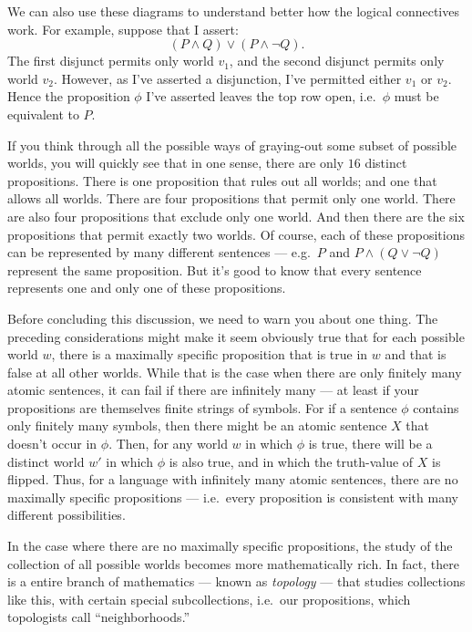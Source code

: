 We can also use these diagrams to understand better how the logical
connectives work.  For example, suppose that I assert:
\[ (P\wedge Q)\vee (P\wedge \neg Q) .\] The first disjunct permits
only world $v_1$, and the second disjunct permits only world $v_2$.
However, as I've asserted a disjunction, I've permitted either $v_1$
or $v_2$.  Hence the proposition $\phi$ I've asserted leaves the top
row open, i.e.\ $\phi$ must be equivalent to $P$.

If you think through all the possible ways of graying-out some subset
of possible worlds, you will quickly see that in one sense, there are
only $16$ distinct propositions.  There is one proposition that rules
out all worlds; and one that allows all worlds.  There are four
propositions that permit only one world.  There are also four
propositions that exclude only one world.  And then there are the six
propositions that permit exactly two worlds.  Of course, each of these
propositions can be represented by many different sentences --- e.g.\
$P$ and $P\wedge (Q\vee\neg Q)$ represent the same proposition.  But
it's good to know that every sentence represents one and only one of
these propositions.

Before concluding this discussion, we need to warn you about one
thing.  The preceding considerations might make it seem obviously true
that for each possible world $w$, there is a maximally specific
proposition that is true in $w$ and that is false at all other worlds.
While that is the case when there are only finitely many atomic
sentences, it can fail if there are infinitely many --- at least if
your propositions are themselves finite strings of symbols.  For if a
sentence $\phi$ contains only finitely many symbols, then there might
be an atomic sentence $X$ that doesn't occur in $\phi$.  Then, for any
world $w$ in which $\phi$ is true, there will be a distinct world $w'$
in which $\phi$ is also true, and in which the truth-value of $X$ is
flipped.  Thus, for a language with infinitely many atomic sentences,
there are no maximally specific propositions --- i.e.\ every
proposition is consistent with many different possibilities.

In the case where there are no maximally specific propositions, the
study of the collection of all possible worlds becomes more
mathematically rich.  In fact, there is a entire branch of mathematics
--- known as {\it topology} --- that studies collections like this,
with certain special subcollections, i.e.\ our propositions, which
topologists call ``neighborhoods.''


